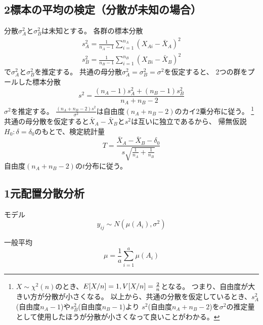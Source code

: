 \subsection{2標本の平均の検定（分散が未知の場合）} \label{sec:2samples_mean_test_unknown_variance}
分散\(\sigma_{A}^2\)と\(\sigma_{B}^2\)は未知とする。
各群の標本分散
\begin{equation}
  \begin{aligned}
    s_{A}^2 = \frac{1}{n_{A} - 1} \sum_{i = 1}^{n_A} (X_{Ai} - \bar{X}_{A})^2 \\
    s_{B}^2 = \frac{1}{n_{B} - 1} \sum_{i = 1}^{n_B} (X_{Bi} - \bar{X}_{B})^2 
  \end{aligned}
\end{equation}
で\(\sigma_{A}^2\)と\(\sigma_{B}^2\)を推定する。
共通の母分散\(\sigma_{A}^2 = \sigma_{B}^2 = \sigma^2\)を仮定すると、
2つの群をプールした標本分散
\begin{equation}
  s^2 = \frac{(n_{A} - 1) s_{A}^2 + (n_{B} - 1) s_{B}^2}{n_{A} + n_{B} - 2}
\end{equation}
\(\sigma^2\)を推定する。
\(\frac{(n_{A} + n_{B} - 2) s^2}{\sigma^2}\)は自由度\((n_{A} + n_{B} - 2)\)のカイ2乗分布に従う。
\footnote{\(X \sim \chi^2(n)\)のとき、\(E \qty[X/n] = 1, V \qty [X/n] = \frac{2}{n}\)となる。
  つまり、自由度が大きい方が分散が小さくなる。
  以上から、共通の分散を仮定しているとき、\(s_{A}^2\)(自由度\(n_{A} - 1\))や\(s_{B}^2\)(自由度\(n_{B} - 1\))より
  \(s^2\)(自由度\(n_{A} + n_{B} - 2\))を\(\sigma^2\)の推定量として使用したほうが分散が小さくなって良いことがわかる。
}
共通の母分散を仮定すると\(\bar{X}_{A} - \bar{X}_{B}\)と\(s^2\)は互いに独立であるから、
帰無仮説\(H_0:\delta = \delta_0\)のもとで、検定統計量
\begin{equation}
  T = \frac{ \bar{X}_{A} - \bar{X}_{B} - \delta_{0}}{ s \sqrt{ \frac{1}{n_{A}} + \frac{1}{n_{B}}}}
\end{equation}
自由度\((n_{A} + n_{B} - 2)\)の\(t\)分布に従う。

\subsection{1元配置分散分析}

モデル
\begin{equation}
  y_{ij} \sim N(\mu(A_i),\sigma^2)
\end{equation}

一般平均 
\begin{equation}
  \mu = \frac{1}{a} \sum_{i = 1}^{a} \mu (A_i)
\end{equation}


